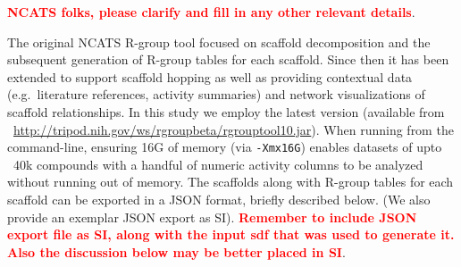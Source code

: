 \documentclass[journal=jacsat,manuscript=article]{achemso}
\newcommand*\eg{e.g.~}
\begin{document}
\textbf{\textcolor{red}{NCATS folks, please clarify and fill in any other relevant details}}.

The original NCATS R-group tool focused on scaffold decomposition and
the subsequent generation of R-group tables for each scaffold. Since
then it has been extended to support scaffold hopping as well as
providing contextual data (\eg literature references, activity
summaries) and network visualizations of scaffold relationships. In
this study we employ the latest version (available from
~\url{http://tripod.nih.gov/ws/rgroupbeta/rgrouptool10.jar}). When
running from the command-line, ensuring 16G of memory (via
\texttt{-Xmx16G}) enables datasets of upto ~40k compounds with a
handful of numeric activity columns to be analyzed without running out
of memory. The scaffolds along with R-group tables for each scaffold
can be exported in a JSON format, briefly described below. (We also
provide an exemplar JSON export as SI). \textbf{\textcolor{red}{Remember to
    include JSON export file as SI, along with the input sdf that was
    used to generate it. Also the discussion below may be better
    placed in SI}}.
\end{document}
